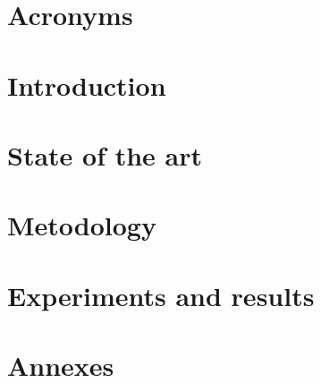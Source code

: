 \documentclass[12pt, a4paper]{article}
\begin{document}

% 

\newpage
{}

\tableofcontents\thispagestyle{empty}\newpage
\listoffigures\thispagestyle{empty}\newpage
\listoftables\thispagestyle{empty}\newpage

\section*{Acronyms}


\section{Introduction}
\label{Introduction}

\newpage

\section{State of the art}
\label{sota}

\newpage

\section{Metodology}
\label{metodologia}

\newpage

\section{Experiments and results}
\label{experiments_and_results}

\newpage

% 
%

\newpage\printbibliography
{}
\newpage

\section*{Annexes}

\end{document}

